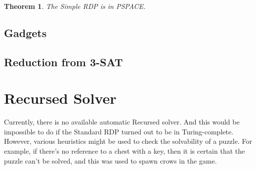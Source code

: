 \documentclass[a4paper]{article}
\theoremstyle{theorem}
\newtheorem{theorem}{Theorem}[section]
\theoremstyle{definition}
\begin{document}
\begin{theorem}
The Simple RDP is in PSPACE.
\end{theorem}

\subsection{Gadgets}
\subsection{Reduction from 3-SAT}

\section{Recursed Solver}
Currently, there is no available automatic Recursed solver. And this would be impossible to do if the Standard RDP turned out to be in Turing-complete.
However, various heuristics might be used to check the solvability of a puzzle. For example, if there's no reference
to a chest with a key, then it is certain that the puzzle can't be solved, and this was used to spawn crows in the game.
\end{document}
